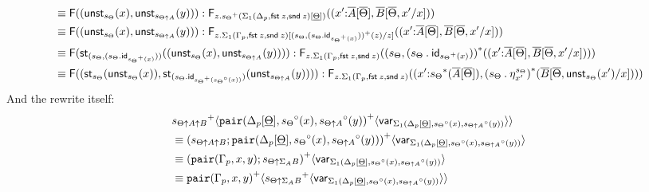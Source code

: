 \documentclass[10pt]{article}
\theoremstyle{definition}
\newcommand\dsd[1]{\ensuremath{\mathsf{#1}}}
\newcommand\F[2]{\ensuremath{\mathsf{F}_{#1}(#2)}}
\newcommand\St[2]{\ensuremath{{#1}^*(#2)}}
\newcommand\StI[2]{\ensuremath{\mathsf{st}_{#1}(#2)}}
\newcommand\UnSt[2]{\ensuremath{\mathsf{unst}_{#1}(#2)}}
\newcommand\FI[1]{\ensuremath{\mathsf{F}{(#1)}}}
\newcommand\TrPlus[2]{\ensuremath{{#1}^+(#2)}}
\newcommand\TrCirc[2]{\ensuremath{{#1}^\circ(#2)}}
\newcommand\var[1]{\ensuremath{\mathsf{var}_{#1}}}
\newcommand{\id}{\mathsf{id}}
\newcommand\ApPlus[2]{\ensuremath{{#1}^+ \langle #2 \rangle }}
\newcommand{\app}[2]{\ensuremath{#1 \: #2}}
\newcommand{\fst}[1]{\app{\dsd{fst}}{#1}}
\newcommand{\snd}[1]{\app{\dsd{snd}}{#1}}
\newcommand{\telety}[3]{\ensuremath{(#1{:}#2,#3)}}
\newcommand\bdot[0]{\mathbin{.}}
\begin{document}
\begin{enumerate}[style = multiline, labelwidth = 80pt]
\begin{align*}
&\equiv \FI{(\UnSt{s_{\Theta}}{x}, \UnSt{s_{\Theta \uparrow A}}{y})} : \F{z.\TrPlus{s_\Theta}{\Sigma_1(\asdep{\Delta}, \fst z, \snd z)[\downstairs{\Theta}]}}{\telety{x'}{\upstairs{A}[\upstairs{\Theta}]}{\upstairs{B}[\upstairs{\Theta},x'/x]}} \\
&\equiv \FI{(\UnSt{s_{\Theta}}{x}, \UnSt{s_{\Theta \uparrow A}}{y})} : \F{z.\Sigma_1(\asdep{\Gamma},\fst z,\snd z)[\TrPlus{(s_\Theta, (s_\Theta \bdot \id_{\TrPlus{s_\Theta}{x}}))}{z}/z]}{\telety{x'}{\upstairs{A}[\upstairs{\Theta}]}{\upstairs{B}[\upstairs{\Theta},x'/x]}} \\
&\equiv \FI{\StI{(s_\Theta, (s_\Theta \bdot \id_{\TrPlus{s_\Theta}{x}}))}{(\UnSt{s_{\Theta}}{x}, \UnSt{s_{\Theta \uparrow A}}{y})}} : \F{z.\Sigma_1(\asdep{\Gamma},\fst z,\snd z)}{\St{(s_\Theta, (s_\Theta \bdot \id_{\TrPlus{s_\Theta}{x}}))}{\telety{x'}{\upstairs{A}[\upstairs{\Theta}]}{\upstairs{B}[\upstairs{\Theta}, x'/x]}}} \\
&\equiv \FI{(\StI{s_\Theta}{\UnSt{s_{\Theta}}{x}}, \StI{(s_\Theta \bdot \id_{\TrPlus{s_\Theta}{\TrCirc{s_\Theta}{x}}})}{\UnSt{s_{\Theta \uparrow A}}{y})}} : \F{z.\Sigma_1(\asdep{\Gamma},\fst z,\snd z)}{\telety{x'}{\St{s_\Theta}{\upstairs{A}[\upstairs{\Theta}]}}{\St{(s_\Theta \bdot \eta^{s_\Theta}_{x'})}{\upstairs{B}[\upstairs{\Theta}, \UnSt{s_\Theta}{x'}/x]}}} \\
\end{align*}
And the rewrite itself:
\begin{align*}
&\ApPlus{s_{\Theta \uparrow A \uparrow B}}{\ApPlus{\mathtt{pair}(\asdep{\Delta}[\downstairs{\Theta}],\TrCirc{s_\Theta}{x},\TrCirc{s_{\Theta \uparrow A}}{y})}{\var{\Sigma_1(\asdep{\Delta}[\downstairs{\Theta}],\TrCirc{s_\Theta}{x},\TrCirc{s_{\Theta \uparrow A}}{y})}}} \\
&\equiv \ApPlus{(s_{\Theta \uparrow A \uparrow B};\mathtt{pair}(\asdep{\Delta}[\downstairs{\Theta}],\TrCirc{s_\Theta}{x},\TrCirc{s_{\Theta \uparrow A}}{y}))}{\var{\Sigma_1(\asdep{\Delta}[\downstairs{\Theta}],\TrCirc{s_\Theta}{x},\TrCirc{s_{\Theta \uparrow A}}{y})}} \\
&\equiv \ApPlus{(\mathtt{pair}(\asdep{\Gamma},x,y);s_{\Theta \uparrow \Sigma_A B})}{\var{\Sigma_1(\asdep{\Delta}[\downstairs{\Theta}],\TrCirc{s_\Theta}{x},\TrCirc{s_{\Theta \uparrow A}}{y})}} \\
&\equiv \ApPlus{\mathtt{pair}(\asdep{\Gamma},x,y)}{\ApPlus{s_{\Theta \uparrow \Sigma_A B}}{\var{\Sigma_1(\asdep{\Delta}[\downstairs{\Theta}],\TrCirc{s_\Theta}{x},\TrCirc{s_{\Theta \uparrow A}}{y})}}} \\

\end{align*}
\end{enumerate}
\end{document}
